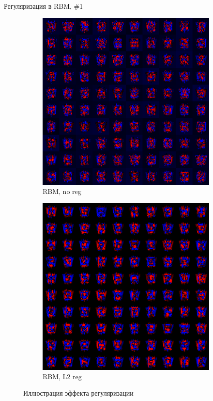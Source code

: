 \documentclass[10pt]{beamer}
\begin{document}
\begin{frame}{Регуляризация в RBM, \#1}

\begin{figure}
        \centering
        \begin{subfigure}[b]{0.5\textwidth}
                \includegraphics[width=1\textwidth]{images/rbm_colmap_noreg.png}
                \caption{RBM, no reg}                
        \end{subfigure}%
        \begin{subfigure}[b]{0.5\textwidth}
                \includegraphics[width=1\textwidth]{images/rbm_colmap_l2.png}
                \caption{RBM, L2 reg}                
        \end{subfigure}       
        \caption{Иллюстрация эффекта регуляризации}
\end{figure}


\end{frame}
\end{document}

